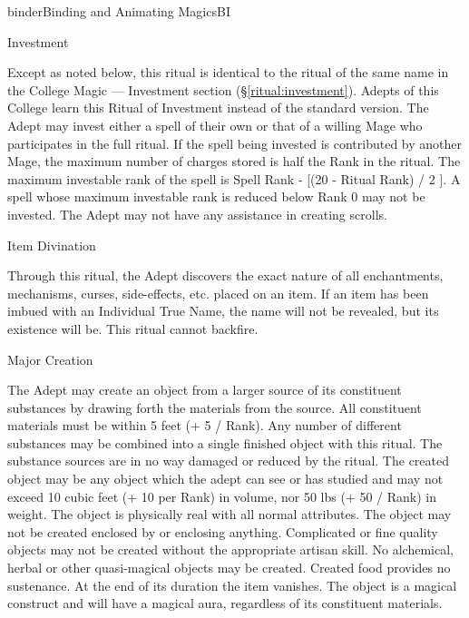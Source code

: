 \begin{College}[1.2]{binder}{Binding and Animating Magics}{BI}
\begin{ritual}[R-2]{Investment}
\begin{effects}
Except as noted below, this ritual is identical to the ritual of the
same name in the College Magic --- Investment section
(\S\ref{ritual:investment}).  Adepts of this College learn this Ritual
of Investment instead of the standard version.  The Adept may invest
either a spell of their own or that of a willing Mage who participates
in the full ritual. If the spell being invested is contributed by
another Mage, the maximum number of charges stored is half the Rank in
the ritual.  The maximum investable rank of the spell is Spell Rank -
[(20 - Ritual Rank) / 2 ].  A spell whose maximum investable rank is
reduced below Rank 0 may not be invested. The Adept may not have any
assistance in creating scrolls.
\end{effects}
\end{ritual}

\begin{ritual}[R-3]{Item Divination}
\begin{effects}
Through this ritual, the Adept discovers the exact nature of all
enchantments, mechanisms, curses, side-effects, etc.  placed on an
item.  If an item has been imbued with an Individual True Name, the
name will not be revealed, but its existence will be. This ritual
cannot backfire.
\end{effects}
\end{ritual}

\begin{ritual}[R-4]{Major Creation}
\begin{effects}
The Adept may create an object from a larger source of its constituent
substances by drawing forth the materials from the source.  All
constituent materials must be within 5 feet (+ 5 / Rank). Any number
of different substances may be combined into a single finished object
with this ritual.  The substance sources are in no way damaged or
reduced by the ritual.  The created object may be any object which the
adept can see or has studied and may not exceed 10 cubic feet (+ 10
per Rank) in volume, nor 50 lbs (+ 50 / Rank) in weight.  The object
is physically real with all normal attributes.  The object may not be
created enclosed by or enclosing anything.  Complicated or fine
quality objects may not be created without the appropriate artisan
skill.  No alchemical, herbal or other quasi-magical objects may be
created.  Created food provides no sustenance. At the end of its
duration the item vanishes. The object is a magical construct and will
have a magical aura, regardless of its constituent materials.
\end{effects}
\end{ritual}


\end{College}
